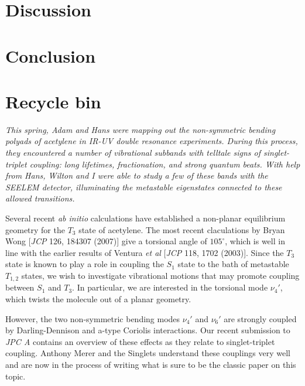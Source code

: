 \documentclass[12pt]{mitthesis}
\begin{document}
\section{Discussion}



\section{Conclusion}

\section{Recycle bin}

\emph{This spring, Adam and Hans were mapping out the non-symmetric
  bending polyads of acetylene in IR-UV double resonance experiments.
  During this process, they encountered a number of vibrational
  subbands with telltale signs of singlet-triplet coupling: long
  lifetimes, fractionation, and strong quantum beats.  With help from
  Hans, Wilton and I were able to study a few of these bands with the
  SEELEM detector, illuminating the metastable eigenstates connected
  to these allowed transitions.}


Several recent \emph{ab initio} calculations have established a
non-planar equilibrium geometry for the $T_3$ state of acetylene.  The
most recent claculations by Bryan Wong [\emph{JCP} 126, 184307 (2007)]
give a torsional angle of $105^\circ$, which is well in line with the
earlier results of Ventura \emph{et al} [\emph{JCP} 118, 1702 (2003)].
Since the $T_3$ state is known to play a role in coupling the $S_1$
state to the bath of metastable $T_{1,2}$ states, we wish to
investigate vibrational motions that may promote coupling between
$S_1$ and $T_3$.  In particular, we are interested in the torsional
mode $\nu_4'$, which twists the molecule out of a planar geometry.

However, the two non-symmetric bending modes $\nu_4'$ and $\nu_6'$ are
strongly coupled by Darling-Dennison and a-type Coriolis interactions.
Our recent submission to \emph{JPC A} contains an overview of these
effects as they relate to singlet-triplet coupling.  Anthony Merer and
the Singlets understand these couplings very well and are now in the
process of writing what is sure to be the classic paper on this topic.
\end{document}
